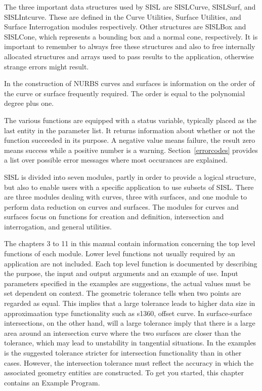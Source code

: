 The three important data structures used by SISL are SISLCurve,
SISLSurf, and SISLIntcurve. These are defined in the Curve Utilities,
Surface Utilities, and Surface Interrogation modules respectively. Other
structures are SISLBox and SISLCone, which represents a bounding box and
a normal cone, respectively. It is
important to remember to always free these structures and also to free
internally allocated structures and arrays used to pass results to the application,
otherwise strange errors might result.

In the construction of NURBS curves and surfaces is information on the order of the curve or
surface frequently required. The order is equal to the polynomial degree plus one.

The various functions are equipped with a status variable, typically
placed as the last entity in the parameter list. It returns information
about whether or not the function succeeded in its purpose. A negative
value means failure, the result zero means success while a positive
number is a warning. Section~\ref{errorcodes} provides a list over
possible error messages where most occurances are explained. 

\medskip
SISL is divided into seven modules, partly in order to provide a logical
structure, but also to enable users with a specific application to use
subsets of SISL. There are three modules dealing with curves, three with
surfaces, and one module to perform data reduction on curves and
surfaces. The modules for
curves and surfaces focus on functions for creation and definition,
intersection and interrogation, and general utilities.

The chapters 3 to 11 in this manual contain information concerning the top
level functions of each module. Lower level functions not usually
required by an application are not included. Each top level function is
documented by describing the purpose, the input and output arguments and
an example of use. Input parameters specified in the examples are suggestions, the
actual values must be set dependent on context. The geometric tolerance tells when
two points are regarded as equal. This implies that a large tolerance leads to
higher data size in approximaation type functionality such as s1360, offset curve.
In surface-surface intersections, on the other hand, will a large tolerance imply
that there is a large area around an intersection curve where the two surfaces are
closer than the tolerance, which may lead to unstability in tangential situations.
In the examples is the suggested tolerance stricter for intersection functionality
than in other cases. However, the intersection tolerance must reflect the accuracy
in which the associated geometry entities are constructed.
To get you started, this chapter contains an Example Program.

